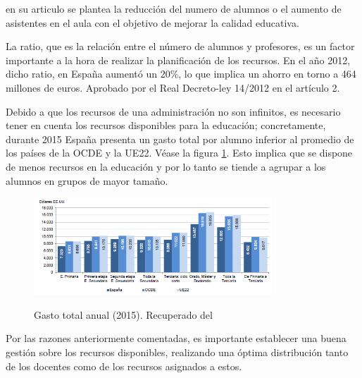  en su articulo se plantea la reducción del numero de alumnos o el aumento de asistentes en el aula con el objetivo de mejorar la calidad educativa. 

La ratio, que es la relación entre el número de alumnos y profesores, es un factor importante a la hora de realizar la planificación de los recursos. En el año 2012, dicho ratio, en España aumentó un 20\%, lo que implica un ahorro en torno a 464 millones de euros. Aprobado por el Real Decreto-ley 14/2012 en el artículo 2.

Debido a que los recursos de una administración no son infinitos, es necesario tener en cuenta los recursos disponibles para la educación; concretamente, durante 2015 España presenta un gasto total por alumno inferior al promedio de los países de la OCDE y la UE22. Véase la figura \ref{fig:procPerformance}. Esto implica que se dispone de menos recursos en la educación y por lo tanto se tiende a agrupar a los alumnos en grupos de mayor tamaño.

\begin{figure}[htb]
	\centering
	\caption{Gasto total anual (2015). Recuperado del \protect{}}
	\includegraphics[width=0.8\textwidth]{recursos/GastoEducacion}
	\label{fig:procPerformance}
\end{figure}
\FloatBarrier

Por las razones anteriormente comentadas, es importante establecer una buena gestión sobre los recursos disponibles, realizando una óptima distribución tanto de los docentes como de los recursos asignados a estos.

